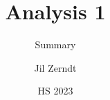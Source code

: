 \documentclass[a4paper, fontsize = 8pt, landscape]{scrartcl}
\title{Analysis 1}
\subtitle{Summary}
\author{Jil Zerndt}
\date{HS 2023}
\begin{document}
\begin{multicols}{2}
	\thispagestyle{TitlePageStyle}
	\maketitleinfo
	\sffamily
	
	\raggedcolumns
	\pagebreak
	
	\raggedcolumns
	\pagebreak
	
	\raggedcolumns
	\pagebreak
	
	\raggedcolumns
	\pagebreak
	
	\raggedcolumns
	\pagebreak
	
	\raggedcolumns
\end{multicols}
\end{document}
